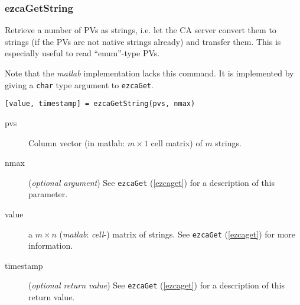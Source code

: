 \documentclass{article}
\newcommand{\matlab}{{\em matlab}}
\newcommand{\com}[1]{{\tt #1}}
\newcommand{\PVITEM}{
\item[pvs] Column vector (in matlab: $m\times 1$ cell matrix)
of $m$ strings.
}
\begin{document}
\subsubsection{ezcaGetString}
\label{getstring}
Retrieve a number of PVs as strings, i.e. let the CA server convert
them to strings (if the PVs are not native strings already) and transfer
them. This is especially useful to read ``enum''-type PVs.

Note that the \matlab{} implementation lacks this command. It is implemented
by giving a \com{char}{} type argument to \com{ezcaGet}.
\begin{verbatim}
[value, timestamp] = ezcaGetString(pvs, nmax)
\end{verbatim}
\begin{description}
\PVITEM
%
%
\item[nmax] ({\em optional argument})
See \com{ezcaGet}{} (\ref{ezcaget}) for a description of this parameter.
\item[value] a $m\times n$ (\matlab: {\em cell}-) matrix of strings. See \com{ezcaGet}{}
(\ref{ezcaget}) for more information.
\item[timestamp] ({\em optional return value})
See \com{ezcaGet}{} (\ref{ezcaget}) for a description of this return value.
\end{description}
\end{document}
